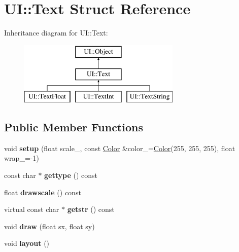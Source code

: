 \hypertarget{struct_u_i_1_1_text}{}\section{UI\+:\+:Text Struct Reference}
\label{struct_u_i_1_1_text}
Inheritance diagram for UI\+:\+:Text\+:\begin{figure}[H]
\begin{center}
\leavevmode
\includegraphics[height=3.000000cm]{struct_u_i_1_1_text}
\end{center}
\end{figure}
\subsection*{Public Member Functions}
\begin{DoxyCompactItemize}
\item 
\mbox{\label{struct_u_i_1_1_text_ab322e9d475975755529dce8d358ef825}} 
void {\bfseries setup} (float scale\+\_, const \hyperlink{struct_u_i_1_1_color}{Color} \&color\+\_\+=\hyperlink{struct_u_i_1_1_color}{Color}(255, 255, 255), float wrap\+\_\+=-\/1)
\item 
\mbox{\label{struct_u_i_1_1_text_a4b12b4c1a7ec8eb7e6b3b02798f2337d}} 
const char $\ast$ {\bfseries gettype} () const
\item 
\mbox{\label{struct_u_i_1_1_text_a8397d608f83b592357300840d6774b96}} 
float {\bfseries drawscale} () const
\item 
\mbox{\label{struct_u_i_1_1_text_a00cd46b7fb3134c9e84f75575d2ba616}} 
virtual const char $\ast$ {\bfseries getstr} () const
\item 
\mbox{\label{struct_u_i_1_1_text_a1a0cc54d96dc9d672ba20e9e7f6e65ab}} 
void {\bfseries draw} (float sx, float sy)
\item 
\mbox{\label{struct_u_i_1_1_text_a004959fd8c061c93f3f77f3db7bb7a8f}} 
void {\bfseries layout} ()
\end{DoxyCompactItemize}

